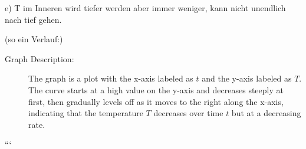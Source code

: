 e) T im Inneren wird tiefer werden aber immer weniger, kann nicht unendlich nach tief gehen.

(so ein Verlauf:)

\begin{description}
    \item[Graph Description:] The graph is a plot with the x-axis labeled as $t$ and the y-axis labeled as $T$. The curve starts at a high value on the y-axis and decreases steeply at first, then gradually levels off as it moves to the right along the x-axis, indicating that the temperature $T$ decreases over time $t$ but at a decreasing rate.
\end{description}

```